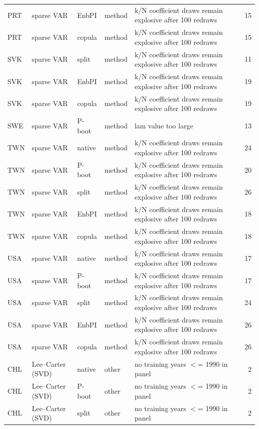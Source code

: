 {\begin{longtable}{@{}lllp{1.6cm}p{6.2cm}r@{}}
PRT & sparse VAR & EnbPI & method & k/N coefficient draws remain explosive after 100 redraws & 15 \\
PRT & sparse VAR & copula & method & k/N coefficient draws remain explosive after 100 redraws & 15 \\
SVK & sparse VAR & split & method & k/N coefficient draws remain explosive after 100 redraws & 11 \\
SVK & sparse VAR & EnbPI & method & k/N coefficient draws remain explosive after 100 redraws & 19 \\
SVK & sparse VAR & copula & method & k/N coefficient draws remain explosive after 100 redraws & 19 \\
SWE & sparse VAR & P-boot & method & lam value too large & 13 \\
TWN & sparse VAR & native & method & k/N coefficient draws remain explosive after 100 redraws & 24 \\
TWN & sparse VAR & P-boot & method & k/N coefficient draws remain explosive after 100 redraws & 20 \\
TWN & sparse VAR & split & method & k/N coefficient draws remain explosive after 100 redraws & 26 \\
TWN & sparse VAR & EnbPI & method & k/N coefficient draws remain explosive after 100 redraws & 18 \\
TWN & sparse VAR & copula & method & k/N coefficient draws remain explosive after 100 redraws & 18 \\
USA & sparse VAR & native & method & k/N coefficient draws remain explosive after 100 redraws & 17 \\
USA & sparse VAR & P-boot & method & k/N coefficient draws remain explosive after 100 redraws & 17 \\
USA & sparse VAR & split & method & k/N coefficient draws remain explosive after 100 redraws & 24 \\
USA & sparse VAR & EnbPI & method & k/N coefficient draws remain explosive after 100 redraws & 26 \\
USA & sparse VAR & copula & method & k/N coefficient draws remain explosive after 100 redraws & 26 \\
CHL & Lee--Carter (SVD) & native & other & no training years $<$= 1990 in panel & 2 \\
CHL & Lee--Carter (SVD) & P-boot & other & no training years $<$= 1990 in panel & 2 \\
CHL & Lee--Carter (SVD) & split & other & no training years $<$= 1990 in panel & 2 \\

\end{longtable}}

